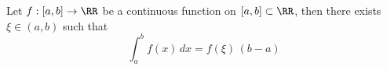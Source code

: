 

\begin{theorem}
Let $f:[a,b]\to\RR$ be a continuous function on 
$[a,b]\subset \RR$, then there exists $\xi\in (a,b)$ 
such that 
$$
\int_a^b f(x)\,dx = f(\xi)\,(b-a)
$$

\end{theorem}

